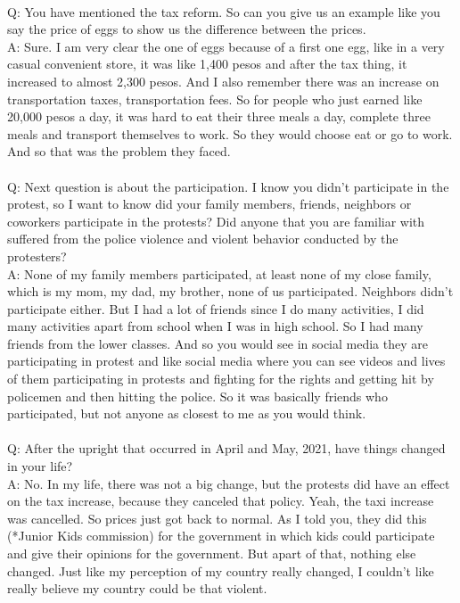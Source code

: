 \documentclass{phyasgn}\usepackage{nag}
\begin{document}
\\
Q: You have mentioned the tax reform. So can you give us an example like you say the price of eggs to show us the difference between the prices.\\
A: Sure. I am very clear the one of eggs because of a first one egg, like in a very casual convenient store, it was like 1,400 pesos and after the tax thing, it increased to almost 2,300 pesos. And I also remember there was an increase on transportation taxes, transportation fees. So for people who just earned like 20,000 pesos a day, it was hard to eat their three meals a day, complete three meals and transport themselves to work. So they would choose eat or go to work. And so that was the problem they faced. \\
\\
Q: Next question is about the participation. I know you didn't participate in the protest, so I want to know did your family members, friends, neighbors or coworkers participate in the protests? Did anyone that you are familiar with suffered from the police violence and violent behavior conducted by the protesters?\\
A: None of my family members participated, at least none of my close family, which is my mom, my dad, my brother, none of us participated. Neighbors didn't participate either. But I had a lot of friends since I do many activities, I did many activities apart from school when I was in high school. So I had many friends from the lower classes. And so you would see in social media they are participating in protest and like social media where you can see videos and lives of them participating in protests and fighting for the rights and getting hit by policemen and then hitting the police. So it was basically friends who participated, but not anyone as closest to me as you would think.\\
\\
Q: After the upright that occurred in April and May, 2021, have things changed in your life?\\
A: No. In my life, there was not a big change, but the protests did have an effect on the tax increase, because they canceled that policy. Yeah, the taxi increase was cancelled. So prices just got back to normal. As I told you, they did this (*Junior Kids commission) for the government in which kids could participate and give their opinions for the government. But apart of that, nothing else changed. Just like my perception of my country really changed, I couldn't like really believe my country could be that violent.\\
\end{document}
